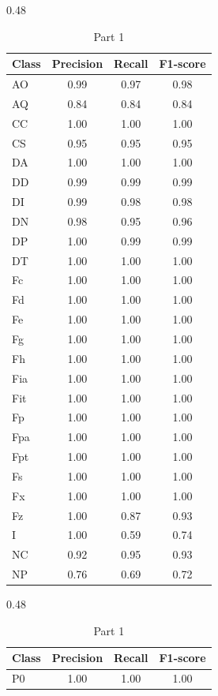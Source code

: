 \begin{table}[H]
\centering
\small

\begin{subtable}{0.48\textwidth}
\centering
\begin{tabular}{lccc}
\hline
\textbf{Class} & \textbf{Precision} & \textbf{Recall} & \textbf{F1-score} \\
\hline
AO  & 0.99 & 0.97 & 0.98 \\
AQ  & 0.84 & 0.84 & 0.84 \\
CC  & 1.00 & 1.00 & 1.00 \\
CS  & 0.95 & 0.95 & 0.95 \\
DA  & 1.00 & 1.00 & 1.00 \\
DD  & 0.99 & 0.99 & 0.99 \\
DI  & 0.99 & 0.98 & 0.98 \\
DN  & 0.98 & 0.95 & 0.96 \\
DP  & 1.00 & 0.99 & 0.99 \\
DT  & 1.00 & 1.00 & 1.00 \\
Fc  & 1.00 & 1.00 & 1.00 \\
Fd  & 1.00 & 1.00 & 1.00 \\
Fe  & 1.00 & 1.00 & 1.00 \\
Fg  & 1.00 & 1.00 & 1.00 \\
Fh  & 1.00 & 1.00 & 1.00 \\
Fia & 1.00 & 1.00 & 1.00 \\
Fit & 1.00 & 1.00 & 1.00 \\
Fp  & 1.00 & 1.00 & 1.00 \\
Fpa & 1.00 & 1.00 & 1.00 \\
Fpt & 1.00 & 1.00 & 1.00 \\
Fs  & 1.00 & 1.00 & 1.00 \\
Fx  & 1.00 & 1.00 & 1.00 \\
Fz  & 1.00 & 0.87 & 0.93 \\
I   & 1.00 & 0.59 & 0.74 \\
NC  & 0.92 & 0.95 & 0.93 \\
NP  & 0.76 & 0.69 & 0.72 \\
\hline
\end{tabular}
\caption{Part 1}
\end{subtable}
\hfill
\begin{subtable}{0.48\textwidth}
\centering
\begin{tabular}{lccc}
\hline
\textbf{Class} & \textbf{Precision} & \textbf{Recall} & \textbf{F1-score} \\
\hline
P0  & 1.00 & 1.00 & 1.00 \\

\end{tabular}
\end{subtable}
\end{table}
